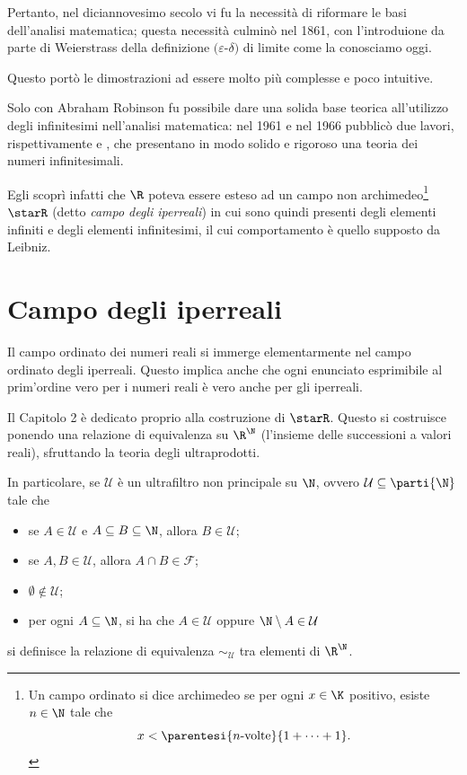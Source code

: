 Pertanto, nel diciannovesimo secolo vi fu la necessità di riformare le basi dell'analisi matematica; questa necessità culminò nel 1861, con l'introduione da parte di Weierstrass della definizione $ (\varepsilon$-$\delta) $ di limite come la conosciamo oggi. 

Questo portò le dimostrazioni ad essere molto più complesse e poco intuitive. 

Solo con Abraham Robinson fu possibile dare una solida base teorica all'utilizzo degli infinitesimi nell'analisi matematica:  nel 1961 e nel 1966 pubblicò due lavori, rispettivamente \cite{robinson_non-standard_1961} e \cite{robinson_non-standard_1966}, che presentano in modo solido e rigoroso una teoria dei numeri infinitesimali.

Egli scoprì infatti che $ \R $ poteva essere esteso ad un campo non archimedeo\footnote{
    Un campo ordinato si dice archimedeo se per ogni $ x \in \K $ positivo, esiste $ n \in \N $ tale che\[x<\parentesi{n\text{-volte}}{1+\dots+1}.\]
}$\starR$ (detto \emph{campo degli iperreali}) in cui sono quindi presenti degli elementi infiniti e degli elementi infinitesimi, il cui comportamento è quello supposto da Leibniz.

\section*{Campo degli iperreali}

Il campo ordinato dei numeri reali si immerge elementarmente nel campo ordinato degli iperreali. Questo implica anche che ogni enunciato esprimibile al prim'ordine vero per i numeri reali è vero anche per gli iperreali. 

Il Capitolo 2 è dedicato proprio alla costruzione di $ \starR $. Questo si costruisce ponendo una relazione di equivalenza su $ \R^{\N} $ (l'insieme delle successioni a valori reali), sfruttando la teoria degli ultraprodotti. 

In particolare, se $ \mathcal{U} $ è un ultrafiltro non principale su $ \N $, ovvero $ \mathcal{U} \subseteq \parti{\N} $ tale che \begin{itemize}
    \item se $ A \in \mathcal{U} $ e $ A \subseteq B \subseteq \N $, allora $ B \in \mathcal{U} $;
    \item se $ A,B \in \mathcal{U} $, allora $ A \cap B \in \mathcal{F} $; 
    \item $ \emptyset \notin \mathcal{U} $;
    \item per ogni $ A \subseteq \N $, si ha che $ A \in \mathcal{U} $ oppure $ \N \setminus A \in \mathcal{U} $
\end{itemize}si definisce la relazione di equivalenza $ \sim_{\mathcal{U}}  $ tra elementi di $ \R^{\N} $. 

